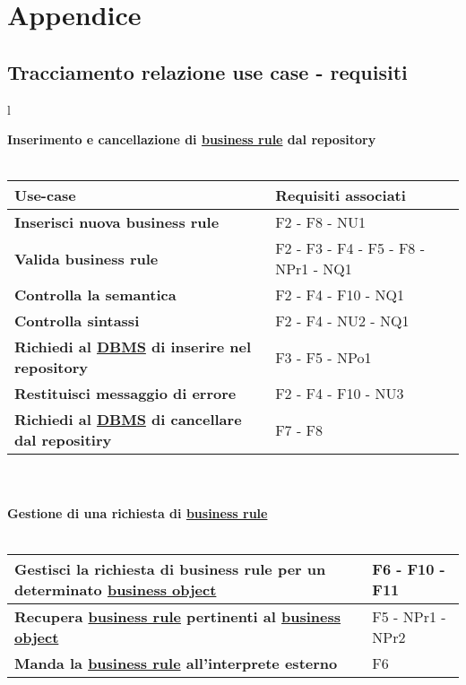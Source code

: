 \chapter{Appendice}
\section{Tracciamento relazione use case - requisiti}
\large{
\begin{tabular}{l}

\textbf{Inserimento e cancellazione di \underline{business rule} dal repository}\\ \\

\begin{tabular}{||p{8cm}||p{4cm}||} \hline
\textbf{Use-case} & \textbf{Requisiti associati} \\ \hline
\textbf{Inserisci nuova business rule} & F2 - F8 - NU1 \\ \hline
\textbf{Valida business rule} & F2 - F3 - F4 - F5 - F8 - NPr1 - NQ1 \\ \hline
\textbf{Controlla la semantica} & F2 - F4 - F10 - NQ1\\ \hline
\textbf{Controlla sintassi} & F2 - F4 - NU2 - NQ1\\ \hline
\textbf{Richiedi al \underline{DBMS} di inserire nel repository} & F3 -  F5 -  NPo1 \\ \hline
\textbf{Restituisci messaggio di errore} & F2 - F4 - F10 - NU3 \\ \hline
\textbf{Richiedi al \underline{DBMS} di cancellare dal repositiry} & F7 - F8 \\ \hline
\end{tabular} \\ \\

\textbf {Gestione di una richiesta di \underline{business rule}}\\ \\

\begin{tabular}{||p{8cm}||p{4cm}||} \hline
\textbf{Gestisci la richiesta di business rule per un determinato \underline{business object}} & F6 - F10 - F11 \\ \hline
\textbf{Recupera \underline{business rule} pertinenti al \underline{business object}} & F5 - NPr1 - NPr2 \\ \hline
\textbf{Manda la \underline{business rule} all'interprete esterno} & F6 \\ \hline
\end{tabular} \\
\end{tabular}
}

